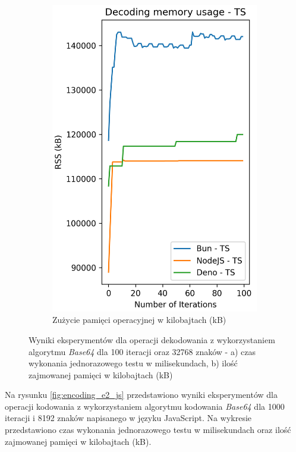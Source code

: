 \begin{figure}[H]
\begin{subfigure}[b]{0.4\textwidth}
    \includegraphics[width=\textwidth]{Figures/coding/base64_100_decoding_ts_memory.png}
    \caption{Zużycie pamięci operacyjnej w kilobajtach (kB)}
    \label{fig:decoding_e1_ts_memory}
  \end{subfigure}
  \hfill
  \caption{Wyniki eksperymentów dla operacji dekodowania z wykorzystaniem algorytmu \textit{Base64} dla 100 iteracji oraz 32768 znaków - a) czas wykonania jednorazowego testu w milisekundach, b) ilość zajmowanej pamięci w kilobajtach (kB)}
  \label{fig:decoding_e1_ts}
\end{figure}

Na rysunku \ref{fig:encoding_e2_js} przedstawiono wyniki eksperymentów dla operacji kodowania z wykorzystaniem algorytmu kodowania \textit{Base64} dla 1000 iteracji i 8192 znaków napisanego w języku JavaScript. Na wykresie przedstawiono czas wykonania jednorazowego testu w milisekundach oraz ilość zajmowanej pamięci w kilobajtach (kB).

